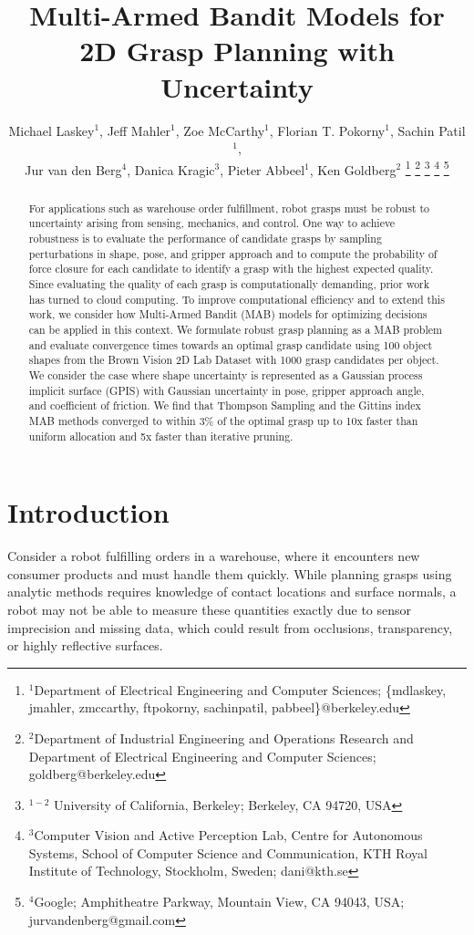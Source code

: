 \documentclass[10pt, conference]{ieeeconf}      %
\title{\LARGE \bf
Multi-Armed Bandit Models for 2D Grasp Planning with Uncertainty}
\author{Michael Laskey$^1$, Jeff Mahler$^1$, Zoe McCarthy$^1$,  Florian T. Pokorny$^1$, Sachin Patil$^1$,\\ Jur van den Berg$^4$,  Danica Kragic$^3$, Pieter Abbeel$^1$, Ken Goldberg$^2$%
\thanks{$^1$Department of Electrical Engineering and Computer Sciences; {\small \{mdlaskey, jmahler, zmccarthy,
ftpokorny, sachinpatil, pabbeel\}@berkeley.edu}}%
\thanks{$^2$Department of Industrial Engineering and Operations Research and Department of Electrical Engineering and Computer Sciences; {\small goldberg@berkeley.edu}}%
\thanks{$^{1-2}$ University of California, Berkeley;  Berkeley, CA 94720, USA}%
\thanks{$^3$Computer Vision and Active Perception Lab, Centre for Autonomous Systems, School of Computer Science and
Communication, KTH Royal Institute of Technology, Stockholm, Sweden; {\small dani@kth.se}}%
\thanks{$^4$Google; Amphitheatre Parkway, Mountain View, CA 94043, USA; {\small jurvandenberg@gmail.com}}%
}
\begin{document}
\maketitle
\thispagestyle{empty}
\pagestyle{empty}



\begin{abstract}
For applications such as warehouse order fulfillment, robot grasps must be robust to uncertainty arising from sensing,
mechanics, and control.  One way to achieve robustness is to evaluate the performance of candidate grasps by sampling
perturbations in shape, pose, and gripper approach and to compute the probability of force closure for each candidate to
identify a grasp with the highest expected quality. Since evaluating the
quality of each grasp is computationally demanding, prior work has turned to cloud computing. To improve computational efficiency and to extend this work, we consider how
Multi-Armed Bandit (MAB) models for optimizing decisions can be applied in this context. We formulate robust grasp
planning as a MAB problem and evaluate convergence times towards an optimal grasp candidate using 100 object shapes from
the Brown Vision 2D Lab Dataset with 1000 grasp candidates per object. We consider the case where shape uncertainty is represented as a Gaussian process implicit surface (GPIS) with Gaussian uncertainty in pose, gripper approach angle, and coefficient of friction. 
We find that Thompson Sampling and the Gittins index MAB methods converged to within 3\% of the optimal grasp up to 10x faster than uniform allocation and 5x faster than iterative pruning. 
\end{abstract}



\section{Introduction}



Consider a robot fulfilling orders in a warehouse, where it encounters new consumer products and must handle them quickly.
While planning grasps using analytic methods requires knowledge of contact locations and surface normals,
a robot may not be able to measure these quantities exactly due to sensor imprecision and missing data, which could result from occlusions, transparency, or highly reflective surfaces. 
\end{document}
